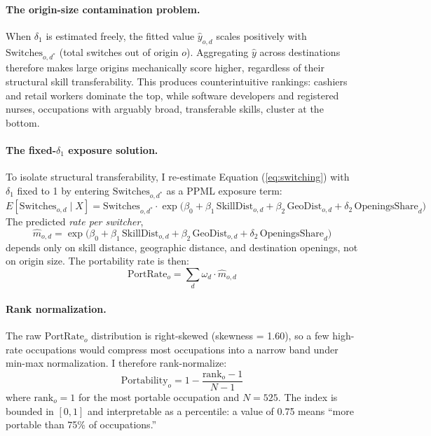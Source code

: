 \documentclass[12pt]{article}
\begin{document}
\paragraph{The origin-size contamination problem.} When $\delta_1$ is estimated freely, the fitted value $\hat{y}_{o,d}$ scales positively with $\text{Switches}_{o,d^*}$ (total switches out of origin $o$). Aggregating $\hat{y}$ across destinations therefore makes large origins mechanically score higher, regardless of their structural skill transferability. This produces counterintuitive rankings: cashiers and retail workers dominate the top, while software developers and registered nurses, occupations with arguably broad, transferable skills, cluster at the bottom.

\paragraph{The fixed-$\delta_1$ exposure solution.} To isolate structural transferability, I re-estimate Equation (\ref{eq:switching}) with $\delta_1$ fixed to 1 by entering $\text{Switches}_{o,d^*}$ as a PPML exposure term:
\begin{equation}
\label{eq:exposure}
E[\text{Switches}_{o,d} \mid X] = \text{Switches}_{o,d^*} \cdot \exp\!\bigl(\beta_0 + \beta_1 \, \text{SkillDist}_{o,d} + \beta_2 \, \text{GeoDist}_{o,d} + \delta_2 \, \text{OpeningsShare}_d\bigr)
\end{equation}
The predicted \emph{rate per switcher},
\begin{equation}
\label{eq:rate}
\hat{m}_{o,d} = \exp\!\bigl(\beta_0 + \beta_1 \, \text{SkillDist}_{o,d} + \beta_2 \, \text{GeoDist}_{o,d} + \delta_2 \, \text{OpeningsShare}_d\bigr)
\end{equation}
depends only on skill distance, geographic distance, and destination openings, not on origin size. The portability rate is then:
\begin{equation}
\label{eq:portrate}
\text{PortRate}_o = \sum_{d} \omega_d \cdot \hat{m}_{o,d}
\end{equation}

\paragraph{Rank normalization.} The raw $\text{PortRate}_o$ distribution is right-skewed (skewness = 1.60), so a few high-rate occupations would compress most occupations into a narrow band under min-max normalization. I therefore rank-normalize:
\begin{equation}
\label{eq:ranknorm}
\text{Portability}_o = 1 - \frac{\text{rank}_o - 1}{N - 1}
\end{equation}
where $\text{rank}_o = 1$ for the most portable occupation and $N = 525$. The index is bounded in $[0,1]$ and interpretable as a percentile: a value of 0.75 means ``more portable than 75\% of occupations.''
\end{document}
